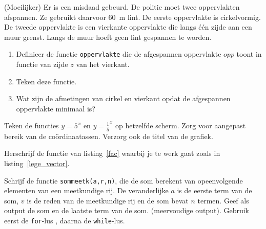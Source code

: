 \begin{oef}
(Moeilijker) Er is een misdaad gebeurd. De politie moet twee oppervlakten afspannen. Ze gebruikt daarvoor \SI{60}{\meter} lint. De eerste oppervlakte is cirkelvormig. De tweede oppervlakte is een vierkante oppervlakte die langs \'e\'en zijde aan een muur grenst. Langs de muur hoeft geen lint gespannen te worden. 
\begin{enumerate}
\item Definieer de functie \verb/oppervlakte/ die de afgespannen oppervlakte $opp$ toont in functie van zijde $z$ van het vierkant.
\item Teken deze functie.
\item Wat zijn de afmetingen van cirkel en vierkant opdat de afgespannen oppervlakte minimaal is?
\end{enumerate}
\end{oef}

\begin{oef}
Teken de functies $y = 5^x$ en $y = \frac15^x$
op hetzelfde scherm. 
Zorg voor aangepast bereik van de co\"ordinaatassen. Verzorg ook de titel van de grafiek.
\end{oef} 


\begin{oef}
Herschrijf de functie van listing~\ref{fac} waarbij je te werk gaat zoals in listing~\ref{lege_vector}.
\end{oef}

\begin{oef}
    Schrijf de functie  \verb/sommeetk(a,r,n)/, 
    die de som berekent van opeenvolgende elementen van een meetkundige rij. De veranderlijke  $a$ is de 
    eerste term van de som, $v$ is de reden van de meetkundige rij en de som 
    bevat $n$ termen. Geef als output  de som en de laatste term van de som.
    (meervoudige output). Gebruik eerst de \verb/for/-lus , daarna  de \verb/while/-lus.
    \end{oef} 



